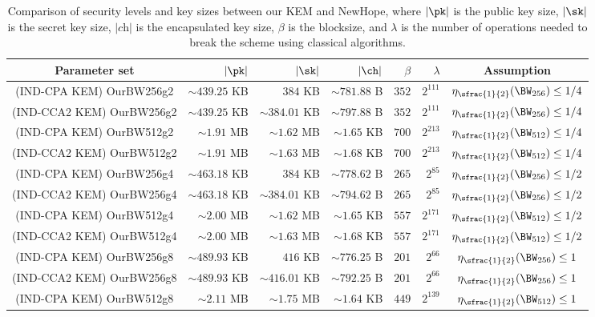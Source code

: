 \begin{table}[htbp]
	\centering
	\setlength{\tabcolsep}{3pt}
	\caption{Comparison of security levels and key sizes between our KEM and NewHope, where $| \pk |$ is the public key size, $| \sk |$ is the secret key size, $| \textit{ch} |$ is the encapsulated key size, $\beta$ is the blocksize, and $\lambda$ is the number of operations needed to break the scheme using classical algorithms.}
	\begin{tabular}{crrrrrc}
		\toprule
		Parameter set & $|\pk|$ & $|\sk|$ & $|\ch|$ & $\beta$ & $\lambda$ & Assumption \\
		\midrule
		(IND-CPA KEM) OurBW256g2 & $\sim 439.25$ KB & $384$ KB & $\sim 781.88$ B & $352$ & $2^{111}$ & $\eta_{\sfrac{1}{2}}(\BW_{256}) \leq 1/4$ \\
		(IND-CCA2 KEM) OurBW256g2 & $\sim 439.25$ KB & $\sim 384.01$ KB & $\sim 797.88$ B & $352$ & $2^{111}$ & $\eta_{\sfrac{1}{2}}(\BW_{256}) \leq 1/4$ \\
		(IND-CPA KEM) OurBW512g2 & $\sim 1.91$ MB & $\sim 1.62$ MB & $\sim 1.65$ KB & $700$ & $2^{213}$ & $\eta_{\sfrac{1}{2}}(\BW_{512}) \leq 1/4$ \\
		(IND-CCA2 KEM) OurBW512g2 & $\sim 1.91$ MB & $\sim 1.63$ MB & $\sim 1.68$ KB & $700$ & $2^{213}$ & $\eta_{\sfrac{1}{2}}(\BW_{512}) \leq 1/4$ \\
		(IND-CPA KEM) OurBW256g4 & $\sim 463.18$ KB & $384$ KB & $\sim 778.62$ B & $265$ & $2^{85}$ & $\eta_{\sfrac{1}{2}}(\BW_{256}) \leq 1/2$ \\
		(IND-CCA2 KEM) OurBW256g4 & $\sim 463.18$ KB & $\sim 384.01$ KB & $\sim 794.62$ B & $265$ & $2^{85}$ & $\eta_{\sfrac{1}{2}}(\BW_{256}) \leq 1/2$ \\
		(IND-CPA KEM) OurBW512g4 & $\sim 2.00$ MB & $\sim 1.62$ MB & $\sim 1.65$ KB & $557$ & $2^{171}$ & $\eta_{\sfrac{1}{2}}(\BW_{512}) \leq 1/2$ \\
		(IND-CCA2 KEM) OurBW512g4 & $\sim 2.00$ MB & $\sim 1.63$ MB & $\sim 1.68$ KB & $557$ & $2^{171}$ & $\eta_{\sfrac{1}{2}}(\BW_{512}) \leq 1/2$ \\
		(IND-CPA KEM) OurBW256g8 & $\sim 489.93$ KB & $416$ KB & $\sim 776.25$ B & $201$ & $2^{66}$ & $\eta_{\sfrac{1}{2}}(\BW_{256}) \leq 1$ \\
		(IND-CCA2 KEM) OurBW256g8 & $\sim 489.93$ KB & $\sim 416.01$ KB & $\sim 792.25$ B & $201$ & $2^{66}$ & $\eta_{\sfrac{1}{2}}(\BW_{256}) \leq 1$ \\
		(IND-CPA KEM) OurBW512g8 & $\sim 2.11$ MB & $\sim 1.75$ MB & $\sim 1.64$ KB & $449$ & $2^{139}$ & $\eta_{\sfrac{1}{2}}(\BW_{512}) \leq 1$ \\

\end{tabular}
\end{table}
